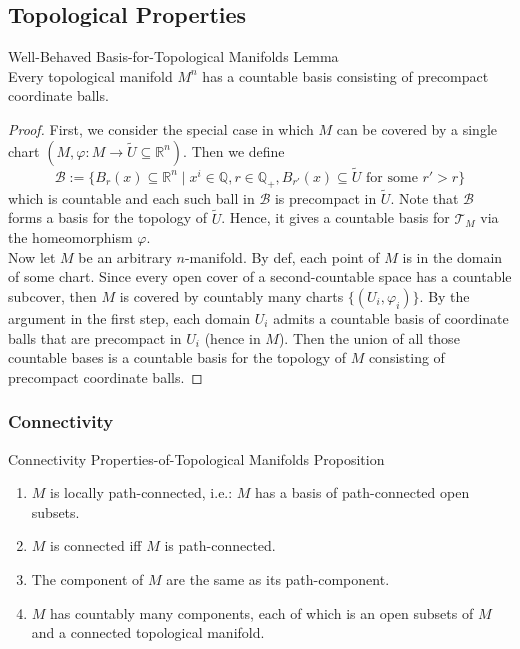 \subsection{Topological Properties}

\begin{lemma}{Well-Behaved Basis-for-Topological Manifolds Lemma}\\
Every topological manifold $M^n$ has a countable basis consisting of precompact coordinate balls.
\end{lemma}

\begin{proof}
    First, we consider the special case in which $M$ can be covered by a single chart $(M, \varphi:M \to \tilde{U} \subseteq \mathbb{R}^n)$. Then we define
    \[
    \mathcal{B}:= \{B_r(x) \subseteq \mathbb{R}^n \mid x^i\in \mathbb{Q} ,r\in \mathbb{Q}_+, B_{r'}(x) \subseteq \tilde{U} \text{ for some } r'>r\} 
    \]
    which is countable and each such ball in $\mathcal{B}$ is precompact in $\tilde{U}$. Note that $\mathcal{B}$ forms a basis for the topology of $\tilde{U}$. Hence, it gives a countable basis for $\mathcal{T}_M$ via the homeomorphism $\varphi$.\\
    Now let $M$ be an arbitrary $n$-manifold. By def, each point of $M$ is in the domain of some chart. Since every open cover of a second-countable space has a countable subcover, then $M$ is covered by countably many charts $\{ (U_i,\varphi_i)\}$. By the argument in the first step, each domain $U_i$ admits a countable basis of coordinate balls that are precompact in $U_i$ (hence in $M$). Then the union of all those countable bases is a countable basis for the topology of $M$ consisting of precompact coordinate balls.
\end{proof}

\subsubsection{Connectivity}

\begin{proposition}{Connectivity Properties-of-Topological Manifolds Proposition}
\begin{enumerate}
    \item $M$ is locally path-connected, i.e.: $M$ has a basis of path-connected open subsets.

    \item $M$ is connected iff $M$ is path-connected.

    \item The component of $M$ are the same as its path-component.

    \item $M$ has countably many components, each of which is an open subsets of $M$ and a connected topological manifold.
\end{enumerate}
\end{proposition}

